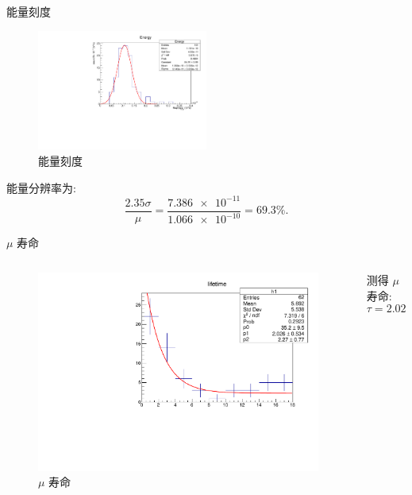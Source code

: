 \documentclass[10pt]{beamer}
\begin{document}
\begin{frame}[label={sec:org732602a}]{能量刻度}
\begin{figure}[htbp]
\centering
\includegraphics[width=0.5\textwidth]{../../DetectorPerform/ECali/qqdist.pdf}
\caption{能量刻度}
\end{figure}

能量分辨率为:
\begin{equation}
\label{eq:4}
\frac{2.35\sigma}{\mu} = \frac{\num{7.386e-11}}{\num{1.066e-10}} = 69.3\%.
\end{equation}
\end{frame}


\begin{frame}[label={sec:org6b888d2}]{\(\mu\) 寿命}
\begin{columns}
\begin{column}{0.5\columnwidth}
\begin{figure}[htbp]
\centering
\includegraphics[width=1.0\textwidth]{../../img/lifeTimeHist.pdf}
\caption{\(\mu\) 寿命}
\end{figure}
\end{column}

\begin{column}{0.5\columnwidth}
测得 \(\mu\) 寿命:  
\begin{equation}
\label{eq:5}
\tau = 2.026 \pm \qty{0.534}{\mu s}.
\end{equation}
\end{column}
\end{columns}
\end{frame}
\end{document}

